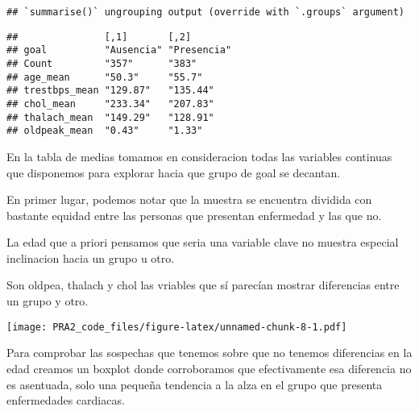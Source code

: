 \documentclass[
]{article}
\newenvironment{Shaded}{\begin{snugshade}}{\end{snugshade}}
\newcommand{\DataTypeTok}[1]{\textcolor[rgb]{0.13,0.29,0.53}{#1}}
\newcommand{\FloatTok}[1]{\textcolor[rgb]{0.00,0.00,0.81}{#1}}
\newcommand{\KeywordTok}[1]{\textcolor[rgb]{0.13,0.29,0.53}{\textbf{#1}}}
\newcommand{\NormalTok}[1]{#1}
\newcommand{\OperatorTok}[1]{\textcolor[rgb]{0.81,0.36,0.00}{\textbf{#1}}}
\newcommand{\StringTok}[1]{\textcolor[rgb]{0.31,0.60,0.02}{#1}}
\begin{document}
\begin{verbatim}
## `summarise()` ungrouping output (override with `.groups` argument)
\end{verbatim}

\begin{verbatim}
##               [,1]       [,2]       
## goal          "Ausencia" "Presencia"
## Count         "357"      "383"      
## age_mean      "50.3"     "55.7"     
## trestbps_mean "129.87"   "135.44"   
## chol_mean     "233.34"   "207.83"   
## thalach_mean  "149.29"   "128.91"   
## oldpeak_mean  "0.43"     "1.33"
\end{verbatim}

En la tabla de medias tomamos en consideracion todas las variables
continuas que disponemos para explorar hacia que grupo de goal se
decantan.

En primer lugar, podemos notar que la muestra se encuentra dividida con
bastante equidad entre las personas que presentan enfermedad y las que
no.

La edad que a priori pensamos que seria una variable clave no muestra
especial inclinacion hacia un grupo u otro.

Son oldpea, thalach y chol las vriables que sí parecían mostrar
diferencias entre un grupo y otro.

\begin{Shaded}
\end{Shaded}

\texttt{[image: PRA2\_code\_files/figure-latex/unnamed-chunk-8-1.pdf]}

Para comprobar las sospechas que tenemos sobre que no tenemos
diferencias en la edad creamos un boxplot donde corroboramos que
efectivamente esa diferencia no es asentuada, solo una pequeña tendencia
a la alza en el grupo que presenta enfermedades cardiacas.
\end{document}
